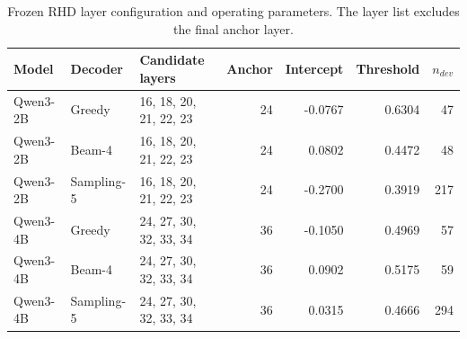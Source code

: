 \begin{table}[htbp]
\centering
\caption{Frozen RHD layer configuration and operating parameters. The layer list excludes the final anchor layer.}
\label{tab:appendix-calibration-summary}
\scriptsize
\begin{tabular}{lllr@{\hspace{0.7em}}rrr}
\toprule
Model & Decoder & Candidate layers & Anchor & Intercept & Threshold & $n_{dev}$ \\
\midrule
Qwen3-2B & Greedy & 16, 18, 20, 21, 22, 23 & 24 & -0.0767 & 0.6304 & 47 \\
Qwen3-2B & Beam-4 & 16, 18, 20, 21, 22, 23 & 24 & 0.0802 & 0.4472 & 48 \\
Qwen3-2B & Sampling-5 & 16, 18, 20, 21, 22, 23 & 24 & -0.2700 & 0.3919 & 217 \\
Qwen3-4B & Greedy & 24, 27, 30, 32, 33, 34 & 36 & -0.1050 & 0.4969 & 57 \\
Qwen3-4B & Beam-4 & 24, 27, 30, 32, 33, 34 & 36 & 0.0902 & 0.5175 & 59 \\
Qwen3-4B & Sampling-5 & 24, 27, 30, 32, 33, 34 & 36 & 0.0315 & 0.4666 & 294 \\
\bottomrule
\end{tabular}
\end{table}
